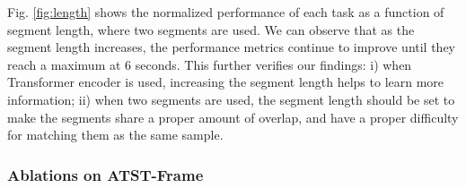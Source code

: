 Fig. \ref{fig:length} shows the normalized performance of each task as a function of segment length, where two segments are used. We can observe that as the segment length increases, the performance metrics continue to improve until they reach a maximum at 6 seconds. This further verifies our findings: i) when Transformer encoder is used, increasing the segment length helps to learn more information; ii) when two segments are used, the segment length should be set to make the segments share a proper amount of overlap, and have a proper difficulty for matching them as the same sample.

\subsubsection{Ablations on ATST-Frame}

